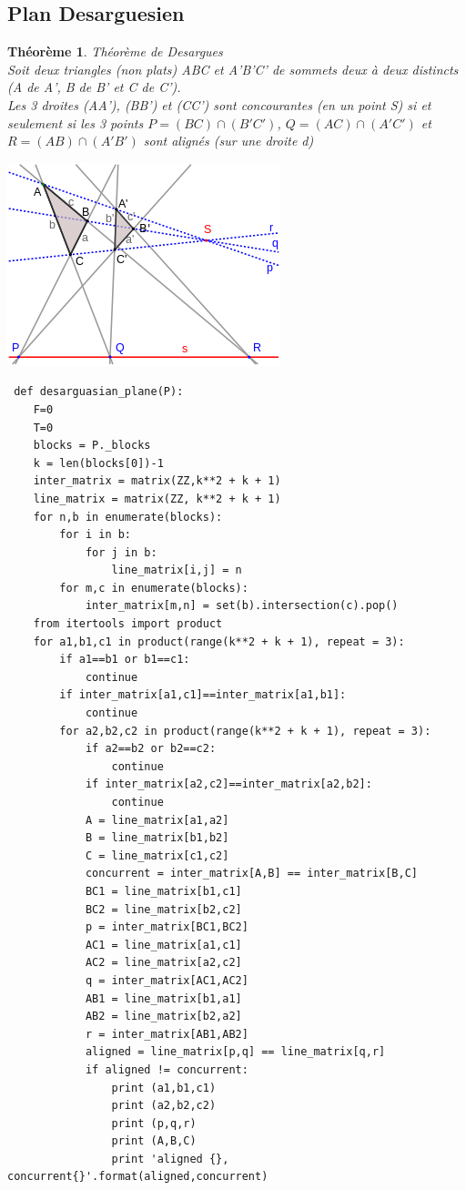\documentclass[a4paper]{article}
\newtheorem{Th}{Théorème}
\begin{document}
\subsection{Plan Desarguesien}

\begin{Th}{Th\'eor\`eme de Desargues}\\
  Soit deux triangles (non plats) ABC et A'B'C' de sommets deux à deux distincts (A de A', B de B' et C de C'). \\
  Les 3 droites (AA'), (BB') et (CC') sont concourantes (en un point S) si et seulement si les 3 points $P = (BC) \cap (B'C')$, $Q = (AC) \cap (A'C')$ et $R = (AB) \cap (A'B')$ sont alignés (sur une droite d)
  \end{Th}

\begin{center}
\includegraphics[scale=0.5]{desargues.png}  
\end{center}

\lstset{language=Python}

\begin{lstlisting}
 def desarguasian_plane(P):
    F=0
    T=0
    blocks = P._blocks
    k = len(blocks[0])-1
    inter_matrix = matrix(ZZ,k**2 + k + 1)
    line_matrix = matrix(ZZ, k**2 + k + 1)
    for n,b in enumerate(blocks):
        for i in b:
            for j in b:
                line_matrix[i,j] = n
        for m,c in enumerate(blocks):
            inter_matrix[m,n] = set(b).intersection(c).pop()
    from itertools import product
    for a1,b1,c1 in product(range(k**2 + k + 1), repeat = 3):
        if a1==b1 or b1==c1:
            continue
        if inter_matrix[a1,c1]==inter_matrix[a1,b1]:
            continue
        for a2,b2,c2 in product(range(k**2 + k + 1), repeat = 3):
            if a2==b2 or b2==c2:
                continue
            if inter_matrix[a2,c2]==inter_matrix[a2,b2]:
                continue
            A = line_matrix[a1,a2]
            B = line_matrix[b1,b2]
            C = line_matrix[c1,c2]
            concurrent = inter_matrix[A,B] == inter_matrix[B,C]
            BC1 = line_matrix[b1,c1]
            BC2 = line_matrix[b2,c2]
            p = inter_matrix[BC1,BC2]
            AC1 = line_matrix[a1,c1]
            AC2 = line_matrix[a2,c2]
            q = inter_matrix[AC1,AC2]
            AB1 = line_matrix[b1,a1]
            AB2 = line_matrix[b2,a2]
            r = inter_matrix[AB1,AB2]
            aligned = line_matrix[p,q] == line_matrix[q,r]
            if aligned != concurrent:
                print (a1,b1,c1)
                print (a2,b2,c2)
                print (p,q,r)
                print (A,B,C)
                print 'aligned {}, concurrent{}'.format(aligned,concurrent)
\end{lstlisting}
\end{document}
